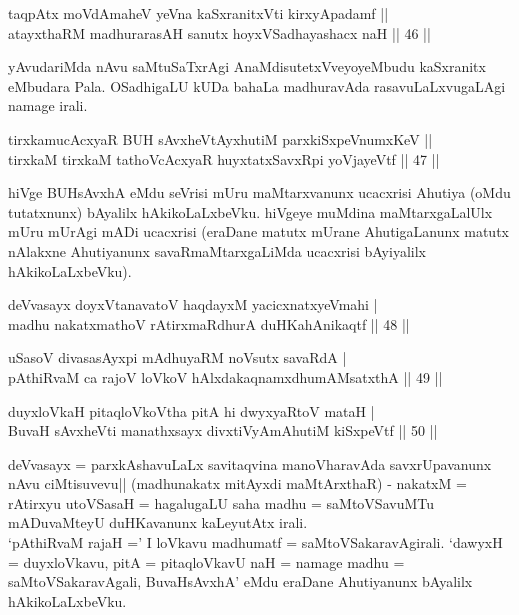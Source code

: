 
\begin{shl}
taqpAtx moVdAmaheV yeVna kaSxranitxVti kirxyApadamf || \\
atayxthaRM madhurarasAH sanutx hoyxVSadhayashacx naH \hfill|| 46 || 
\end{shl}

\begin{artha}
yAvudariMda nAvu saMtuSaTxrAgi AnaMdisutetxVveyoyeMbudu kaSxranitx 
eMbudara Pala. OSadhigaLU kUDa bahaLa madhuravAda rasavuLaLxvugaLAgi 
namage irali.
\end{artha}

\begin{shl}
tirxkamucAcxyaR BUH sAvxheVtAyxhutiM parxkiSxpeVnumxKeV || \\
tirxkaM tirxkaM tathoVcAcxyaR huyxtatxSavxRpi yoVjayeVtf \hfill|| 47 || 
\end{shl}

\begin{artha}
hiVge BUHsAvxhA eMdu seVrisi mUru maMtarxvanunx ucacxrisi Ahutiya 
(oMdu tutatxnunx) bAyalilx hAkikoLaLxbeVku. hiVgeye muMdina 
maMtarxgaLalUlx mUru mUrAgi mADi ucacxrisi (eraDane matutx mUrane 
AhutigaLanunx matutx nAlakxne Ahutiyanunx savaRmaMtarxgaLiMda 
ucacxrisi bAyiyalilx hAkikoLaLxbeVku).
\end{artha}


\begin{shl}
deVvasayx doyxVtanavatoV haqdayxM yacicxnatxyeVmahi | \\
madhu nakatxmathoV rAtirxmaRdhurA duHKahAnikaqtf \hfill|| 48 || 
\end{shl}

\begin{shl}
uSasoV divasasAyxpi mAdhuyaRM noV\s sutx savaRdA | \\
pAthiRvaM ca rajoV loVkoV hAlxdakaqnamxdhumAMsatxthA \hfill|| 49 || 
\end{shl}

\begin{shl}
duyxloVkaH pitaqloVkoV\s tha pitA hi dwyxyaRtoV mataH | \\
BuvaH sAvxheVti manathxsayx divxtiVyAmAhutiM kiSxpeVtf \hfill|| 50 || 
\end{shl}

\begin{artha}
deVvasayx = parxkAshavuLaLx savitaqvina manoVharavAda savxrUpavanunx 
nAvu ciMtisuvevu|| (madhunakatx mitAyxdi maMtArxthaR) - nakatxM = 
rAtirxyu utoVSasaH = hagalugaLU saha madhu = saMtoVSavuMTu mADuvaMteyU 
duHKavanunx kaLeyutAtx irali.\\
`pAthiRvaM rajaH =' I loVkavu madhumatf = saMtoVSakaravAgirali. `dawyxH 
= duyxloVkavu, pitA = pitaqloVkavU naH = namage madhu = 
saMtoVSakaravAgali, BuvaHsAvxhA' eMdu eraDane Ahutiyanunx bAyalilx 
hAkikoLaLxbeVku.
\end{artha}

